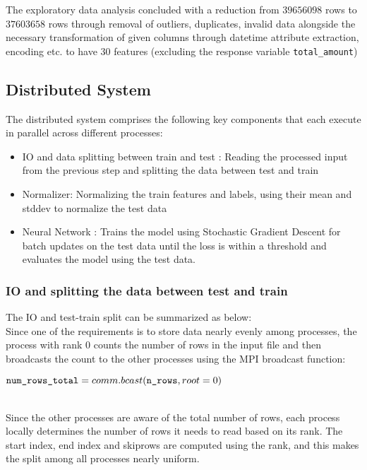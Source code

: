 \documentclass{article}
\begin{document}
The exploratory data analysis concluded with a reduction from $39656098$ rows to $37603658$ rows through removal of outliers, duplicates, invalid data alongside the necessary transformation of given columns through datetime attribute extraction, encoding etc. to have $30$ features (excluding the response variable \verb|total_amount|)

\subsection{Distributed System}
The distributed system comprises the following key components that each execute in parallel across different processes:
\begin{itemize}
    \item IO and data splitting between train and test : Reading the processed input from the previous step and splitting the data between test and train 
    \item Normalizer: Normalizing the train features and labels, using their mean and stddev to normalize the test data
    \item Neural Network : Trains the model using Stochastic Gradient Descent for batch updates on the test data until the loss is within a threshold and evaluates the model using the test data. 
\end{itemize}

\subsubsection{IO and splitting the data between test and train}

The IO and test-train split can be summarized as below: \\

Since one of the requirements is to store data nearly evenly among processes, the process with rank $0$ counts the number of rows in the input file and then broadcasts the count to the other processes using the MPI broadcast function:\\
    
\begin{code}
$\verb|num_rows_total| = comm.bcast(\verb|n_rows|, root=0)$       
\end{code} \\

Since the other processes are aware of the total number of rows, each process locally determines the number of rows it needs to read based on its rank. The start index, end index and skiprows are computed using the rank, and this makes the split among all processes nearly uniform. \\
\end{document}
